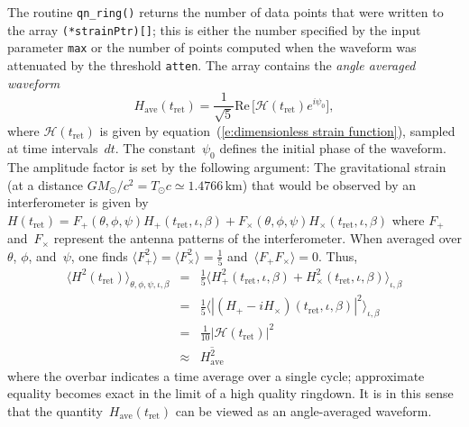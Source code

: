 The routine \texttt{qn\_ring()} returns the number of data points that were
written to the array \texttt{(*strainPtr)[]}; this
is either the number specified by the input parameter \texttt{max} or the
number of points computed when the waveform was attenuated by the threshold
\texttt{atten}.  The array contains the \emph{angle averaged waveform}
\begin{equation}
    H_{\mathrm{\scriptstyle ave}}(t_{\mathrm{\scriptstyle ret}}) =
    \frac{1}{\surd5} {\mathrm{Re}}\,\bigl[
    {\mathcal{H}}(t_{\mathrm{\scriptstyle ret}}) e^{i\psi_0} \bigr],
\end{equation}
where ${\mathcal{H}}(t_{\mathrm{\scriptstyle ret}})$ is given by
equation~(\ref{e:dimensionless strain function}), sampled at time
intervals~$dt$.  The constant~$\psi_0$ defines the initial phase of the
waveform.  The amplitude factor is set by the following argument:
The gravitational strain (at a distance
$GM_\odot/c^2=T_\odot c\simeq1.4766\,{\mathrm{km}}$)
that would be observed by an interferometer is
given by~$H(t_{\mathrm{\scriptstyle ret}})=F_+(\theta,\phi,\psi)
 H_+(t_{\mathrm{\scriptstyle ret}},\iota,\beta)
 + F_\times(\theta,\phi,\psi)
 H_\times(t_{\mathrm{\scriptstyle ret}},\iota,\beta)$ where $F_+$
and~$F_\times$ represent the antenna patterns of the interferometer.
When averaged over $\theta$, $\phi$, and~$\psi$, one finds
$\langle F_+^2\rangle=\langle F_\times^2\rangle=\frac{1}{5}$
and~$\langle F_+F_\times\rangle=0$.  Thus,
\begin{eqnarray}
  \langle H^2(t_{\mathrm{\scriptstyle ret}})
    \rangle_{\theta,\phi,\psi,\iota,\beta}
  &=& {\textstyle\frac{1}{5}} \langle
      H_+^2(t_{\mathrm{\scriptstyle ret}},\iota,\beta)
      + H_\times^2(t_{\mathrm{\scriptstyle ret}},\iota,\beta)
      \rangle_{\iota,\beta} \nonumber\\
  &=& {\textstyle\frac{1}{5}} \langle
      | (H_+ - iH_\times)(t_{\mathrm{\scriptstyle ret}},\iota,\beta) |^2
      \rangle_{\iota,\beta} \nonumber\\
  &=& {\textstyle\frac{1}{10}} |{\mathcal{H}}(t_{\mathrm{\scriptstyle ret}})|^2
      \nonumber\\
  &\approx& \overline{H_{\mathrm{\scriptstyle ave}}^2}
\end{eqnarray}
where the overbar indicates a time average over a single cycle; approximate
equality becomes exact in the limit of a high quality ringdown.  It is in
this sense that the
quantity~$H_{\mathrm{\scriptstyle ave}}(t_{\mathrm{\scriptstyle ret}})$ can be
viewed as an angle-averaged waveform.

